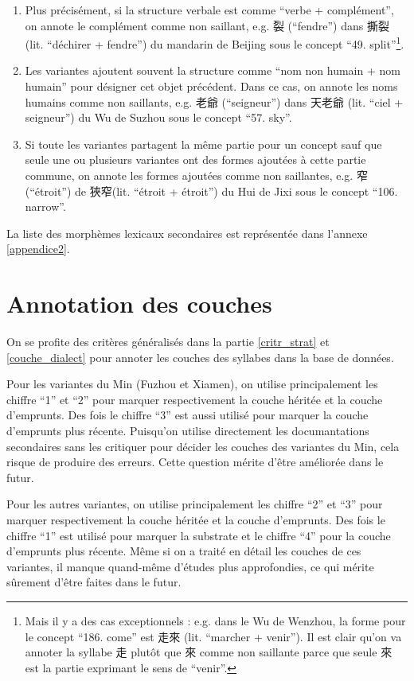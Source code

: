 \documentclass{scrbook}
\newcounter{c}[subsubsection]
\begin{document}
\begin{sloppypar}
\begin{enumerate}
\item{Plus précisément, si la structure verbale est comme ``verbe + complément'', on annote le complément comme non saillant, e.g. 裂 (``fendre'') dans 撕裂 (lit. ``déchirer + fendre'') du mandarin de Beijing sous le concept ``49. split''\footnote{Mais il y a des cas exceptionnels : e.g. dans le Wu de Wenzhou, la forme pour le concept ``186. come'' est 走來 (lit. ``marcher + venir''). Il est clair qu'on va annoter la syllabe 走 plutôt que 來 comme non saillante parce que seule 來 est la partie exprimant le sens de ``venir''.}.}

\item{Les variantes ajoutent souvent la structure comme ``nom non humain + nom humain'' pour désigner cet objet précédent. Dans ce cas, on annote les noms humains comme non saillants, e.g. 老爺 (``seigneur'') dans 天老爺 (lit. ``ciel + seigneur'') du Wu de Suzhou sous le concept ``57. sky''.}

\item{Si toute les variantes partagent la même partie pour un concept sauf que seule une ou plusieurs variantes ont des formes ajoutées à cette partie commune, on annote les formes ajoutées comme non saillantes, e.g. 窄 (``étroit'') de 狹窄(lit. ``étroit + étroit'') du Hui de Jixi sous le concept ``106. narrow''.}
\end{enumerate}

La liste des morphèmes lexicaux secondaires est représentée dans l'annexe \ref{appendice2}.

\section{Annotation des couches}\label{annot_couches}
On se profite des critères généralisés dans la partie \ref{critr_strat} et \ref{couche_dialect} pour annoter les couches des syllabes dans la base de données.

Pour les variantes du Min (Fuzhou et Xiamen), on utilise principalement les chiffre ``1'' et ``2'' pour marquer respectivement la couche héritée et la couche d'emprunts. Des fois le chiffre ``3'' est aussi utilisé pour marquer la couche d'emprunts plus récente. Puisqu'on utilise directement les documantations secondaires sans les critiquer pour décider les couches des variantes du Min, cela risque de produire des erreurs. Cette question mérite d'être améliorée dans le futur.

Pour les autres variantes, on utilise principalement les chiffre ``2'' et ``3'' pour marquer respectivement la couche héritée et la couche d'emprunts. Des fois le chiffre ``1'' est utilisé pour marquer la substrate et le chiffre ``4'' pour la couche d'emprunts plus récente. Même si on a traité en détail les couches de ces variantes, il manque quand-même d'études plus approfondies, ce qui mérite sûrement d'être faites dans le futur.


\end{sloppypar}
\end{document}
